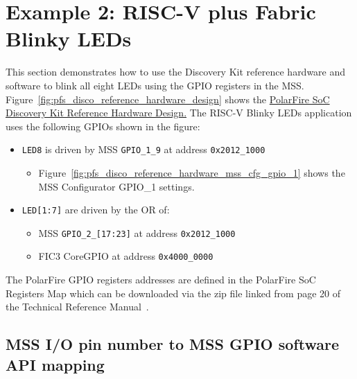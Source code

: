 \section{Example 2: RISC-V plus Fabric Blinky LEDs}
\label{sec:riscv_blinky}

This section demonstrates how to use the Discovery Kit reference hardware
and software to blink all eight LEDs using the GPIO registers in the MSS.
%
Figure~\ref{fig:pfs_disco_reference_hardware_design} shows the
\href{https://github.com/polarfire-soc/polarfire-soc-discovery-kit-reference-design}
{PolarFire SoC Discovery Kit Reference Hardware Design.}
%
The RISC-V Blinky LEDs application uses the following GPIOs shown in the figure:
%
\begin{itemize}
\item \texttt{LED8} is driven by MSS \texttt{GPIO\_1\_9} at address \texttt{0x2012\_1000}
\begin{itemize}
\item
Figure~\ref{fig:pfs_disco_reference_hardware_mss_cfg_gpio_1} shows the MSS Configurator
GPIO\_1 settings.
\end{itemize}
%
\item \texttt{LED[1:7]} are driven by the OR of:
\begin{itemize}
\item MSS \texttt{GPIO\_2\_[17:23]} at address \texttt{0x2012\_1000}
\item FIC3 CoreGPIO at address \texttt{0x4000\_0000}
\end{itemize}
\end{itemize}
%
The PolarFire GPIO registers addresses are defined in the PolarFire SoC
Registers Map which can be downloaded via the zip file linked from
page 20 of the Technical Reference Manual~\cite{Microchip_PFSoC_TRM_2025}.

\subsection{MSS I/O pin number to MSS GPIO software API mapping}

